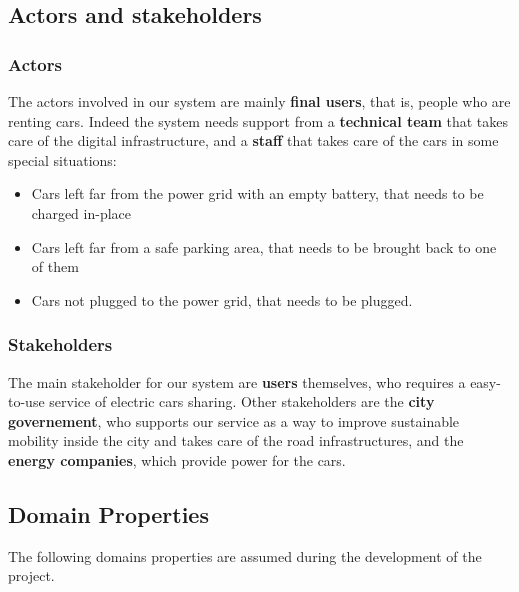 \documentclass[11pt]{article} %
\begin{document}
\subsection{Actors and stakeholders}

\subsubsection{Actors}
The actors involved in our system are mainly \textbf{final users}, that is, people who are renting cars. Indeed the system needs support from a \textbf{technical team} that takes care of the digital infrastructure, and a \textbf{staff} that takes care of the cars in some special situations:
\begin{itemize} 
	\item Cars left far from the power grid with an empty battery, that needs to be charged in-place
	\item Cars left far from a safe parking area, that needs to be brought back to one of them
	\item Cars not plugged to the power grid, that needs to be plugged.
\end{itemize}

\subsubsection{Stakeholders}
The main stakeholder for our system are \textbf{users} themselves, who requires a easy-to-use service of electric cars sharing. Other stakeholders are the \textbf{city governement}, who supports our service as a way to improve sustainable mobility inside the city and takes care of the road infrastructures, and the \textbf{energy companies}, which provide power for the cars.

\subsection{Domain Properties}

The following domains properties are assumed during the development of the project.
\end{document}
